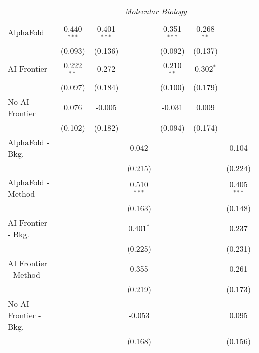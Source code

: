 \begin{tabular}{lcccccc}
 & \multicolumn{6}{c}{\textit{Molecular Biology}} \\ \\
   AlphaFold               & 0.440$^{***}$ & 0.401$^{***}$ &               & 0.351$^{***}$ & 0.268$^{**}$ &   \\   
                           & (0.093)       & (0.136)       &               & (0.092)       & (0.137)      &   \\   
   AI Frontier             & 0.222$^{**}$  & 0.272         &               & 0.210$^{**}$  & 0.302$^{*}$  &   \\   
                           & (0.097)       & (0.184)       &               & (0.100)       & (0.179)      &   \\   
   No AI Frontier          & 0.076         & -0.005        &               & -0.031        & 0.009        &   \\   
                           & (0.102)       & (0.182)       &               & (0.094)       & (0.174)      &   \\   
   AlphaFold - Bkg.        &               &               & 0.042         &               &              & 0.104\\   
                           &               &               & (0.215)       &               &              & (0.224)\\   
   AlphaFold - Method      &               &               & 0.510$^{***}$ &               &              & 0.405$^{***}$\\   
                           &               &               & (0.163)       &               &              & (0.148)\\   
   AI Frontier - Bkg.      &               &               & 0.401$^{*}$   &               &              & 0.237\\   
                           &               &               & (0.225)       &               &              & (0.231)\\   
   AI Frontier - Method    &               &               & 0.355         &               &              & 0.261\\   
                           &               &               & (0.219)       &               &              & (0.173)\\   
   No AI Frontier - Bkg.   &               &               & -0.053        &               &              & 0.095\\   
                           &               &               & (0.168)       &               &              & (0.156)\\   

\end{tabular}
